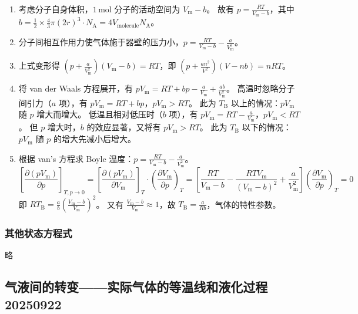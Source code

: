\begin{enumerate}
    \item 考虑分子自身体积，$1\mathrm{\,mol}$ 分子的活动空间为 $V_{\mathrm{m}} - b$。 故有 $p = \frac{RT}{V_{\mathrm{m}} - b}$，其中 $b = \frac12 \times \frac43 \pi (2r)^3 \cdot N_{\mathrm{A}} = 4 V_{\text{molecule}} N_{\mathrm{A}}$。
    \item 分子间相互作用力使气体施于器壁的压力小，$p = \frac{RT}{V_{\mathrm{m}} - b} - \frac{a}{V_{\mathrm{m}}^2}$。
    \item 上式变形得 $\left(p + \frac{a}{V_{\mathrm{m}}^2}\right)(V_{\mathrm{m}} - b) = RT$，即 $\left(p + \frac{an^2}{V^2}\right)(V - nb) = nRT$。
    \item 将 van der Waals 方程展开，有 $p V_{\mathrm{m}} = RT + bp - \frac{a}{V_{\mathrm{m}}} + \frac{ab}{V_{\mathrm{m}}^2}$。 
    高温时忽略分子间引力（$a$ 项），有 $p V_{\mathrm{m}} = RT + bp$，$p V_{\mathrm{m}} > RT$。 此为 $T_{\mathrm{B}}$ 以上的情况：$p V_{\mathrm{m}}$ 随 $p$ 增大而增大。
    低温且相对低压时（$b$ 项），有 $p V_{\mathrm{m}} = RT - \frac{a}{V_{\mathrm{m}}}$，$p V_{\mathrm{m}} < RT$。 但 $p$ 增大时，$b$ 的效应显著，又将有 $p V_{\mathrm{m}} > RT$。 此为 $T_{\mathrm{B}}$ 以下的情况：$p V_{\mathrm{m}}$ 随 $p$ 的增大先减小后增大。
    \item 根据 van's 方程求 Boyle 温度：$p = \frac{RT}{V_{\mathrm{m}} - b} - \frac{a}{V_{\mathrm{m}}^2}$。
    \begin{equation*}
        \left[ \frac{\partial(p V_{\mathrm{m}})}{\partial p} \right]_{T, p \to 0} = \left[ \frac{\partial(p V_{\mathrm{m}})}{\partial V_{\mathrm{m}}} \right]_T \cdot \left( \frac{\partial V_{\mathrm{m}}}{\partial p} \right)_T = \left[ \frac{RT}{V_{\mathrm{m}} - b} - \frac{RT V_{\mathrm{m}}}{(V_{\mathrm{m}} - b)^2} + \frac{a}{V_{\mathrm{m}}^2} \right] \left( \frac{\partial V_{\mathrm{m}}}{\partial p} \right)_T = 0
    \end{equation*}
    即 $RT_{\mathrm{B}} = \frac{a}{b} \left(\frac{V_{\mathrm{m}} - b}{V_{\mathrm{m}}}\right)^2$。 又有 $\frac{V_{\mathrm{m}} - b}{V_{\mathrm{m}}} \approx 1$，故 $T_{\mathrm{B}} = \frac{a}{Rb}$，气体的特性参数。
\end{enumerate}

\subsubsection{其他状态方程式}

略

\subsection{气液间的转变——实际气体的等温线和液化过程 20250922}

